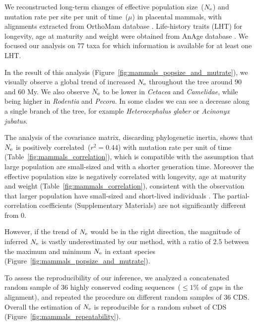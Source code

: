 We reconstructed long-term changes of effective population size~($N_{\mathrm{e}}$) and mutation rate per site per unit of time~($\mu$) in placental mammals, with alignments extracted from OrthoMam database \citep{Ranwez2007,Scornavacca2019}.
Life-history traits (LHT) for longevity, age at maturity and weight were obtained from AnAge database \citep{DEMAGALHAES2009,Tacutu2012}.
We focused our analysis on 77 taxa for which information is available for at least one LHT.

In the result of this analysis (Figure~\ref{fig:mammals_popsize_and_mutrate}), we visually observe a global trend of increased $N_{\mathrm{e}}$ throughout the tree around $90$ and $60$ My.
We also observe $N_{\mathrm{e}}$ to be lower in \textit{Cetacea} and \textit{Camelidae}, while being higher in \textit{Rodentia} and \textit{Pecora}.
In some clades we can see a decrease along a single branch of the tree, for example \textit{Heterocephalus glaber} or \textit{Acinonyx jubatus}.

The analysis of the covariance matrix, discarding phylogenetic inertia, shows that $N_{\mathrm{e}}$ is positively correlated~($r^2 = 0.44$) with mutation rate per unit of time (Table~\ref{fig:mammals_correlation}), which is compatible with the assumption that large population are small-sized and with a shorter generation time.
Moreover the effective population size is negatively correlated with longevity, age at maturity and weight (Table~\ref{fig:mammals_correlation}), consistent with the observation that larger population have small-sized and short-lived individuals \citep{Galtier2016,Romiguier2014}.
The partial-correlation coefficients (Supplementary Materials) are not significantly different from $0$.

However, if the trend of $N_{\mathrm{e}}$ would be in the right direction, the magnitude of inferred $N_{\mathrm{e}}$ is vastly underestimated by our method, with a ratio of $2.5$ between the maximum and minimum $N_{\mathrm{e}}$ in extant species (Figure~\ref{fig:mammals_popsize_and_mutrate}).

To assess the reproducibility of our inference, we analyzed a concatenated random sample of 36 highly conserved coding sequences~($\leq 1\%$ of gaps in the alignment), and repeated the procedure on different random samples of 36 CDS.
Overall the estimation of $N_{\mathrm{e}}$ is reproducible for a random subset of CDS (Figure~\ref{fig:mammals_repeatability}).

